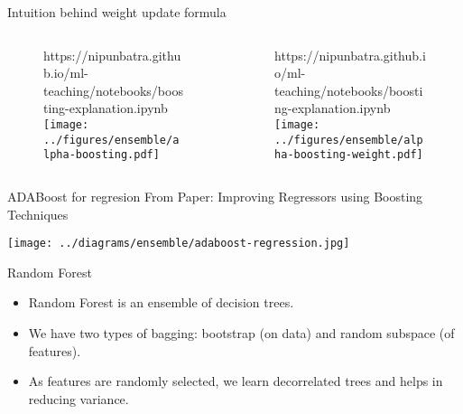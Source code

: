 \documentclass{beamer}
\begin{document}
\begin{frame}{Intuition behind weight update formula}
  \begin{columns}
    \pause \begin{column}{0.5\textwidth}

      \begin{figure}[htp]
        \centering
        \begin{notebookbox}{https://nipunbatra.github.io/ml-teaching/notebooks/boosting-explanation.ipynb}
          \texttt{[image: ../figures/ensemble/alpha-boosting.pdf]}
        \end{notebookbox}
      \end{figure}
    \end{column}
    \pause \begin{column}{0.5\textwidth}
      \begin{figure}[htp]
        \centering
        \begin{notebookbox}{https://nipunbatra.github.io/ml-teaching/notebooks/boosting-explanation.ipynb}
          \texttt{[image: ../figures/ensemble/alpha-boosting-weight.pdf]}
        \end{notebookbox}
      \end{figure}
    \end{column}
  \end{columns}


\end{frame}

\begin{frame}{ADABoost for regresion}
  From Paper: Improving Regressors using Boosting Techniques

  \texttt{[image: ../diagrams/ensemble/adaboost-regression.jpg]}
  
\end{frame}

\begin{frame}{Random Forest}
  \begin{itemize}
    \item Random Forest is an ensemble of decision trees.
    \item We have two types of bagging: bootstrap (on data) and random subspace (of features).
    \item As features are randomly selected, we learn decorrelated trees and helps in reducing variance.
  \end{itemize}
\end{frame}
\end{document}
